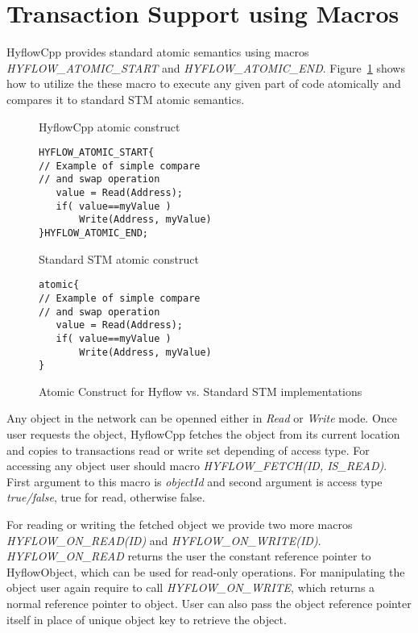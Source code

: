 \documentclass[12pt,english]{report}
\begin{document}
\section{Transaction Support using Macros}

HyflowCpp provides standard atomic semantics using macros \emph{HYFLOW{\_}ATOMIC{\_}START} and \emph{HYFLOW{\_}ATOMIC{\_}END}. Figure~\ref{Fig:atomicConstr} shows how to utilize the these macro to execute any given part of code atomically and compares it to standard STM atomic semantics. 

\begin{figure}
\centering 
\begin{footnotesize}
\begin{minipage}[b]{0.45\linewidth}\centering
HyflowCpp atomic construct 
\begin{lstlisting}
HYFLOW_ATOMIC_START{
// Example of simple compare
// and swap operation
   value = Read(Address);
   if( value==myValue )
       Write(Address, myValue)
}HYFLOW_ATOMIC_END;
\end{lstlisting} 
\end{minipage} 
\begin{minipage}[b]{0.45\linewidth}\centering
Standard STM atomic construct
\begin{lstlisting}   					   
atomic{
// Example of simple compare
// and swap operation
   value = Read(Address);
   if( value==myValue )
       Write(Address, myValue)
}
\end{lstlisting}			  
\end{minipage}
\end{footnotesize}
\label{Fig:atomicConstr}\caption{Atomic Construct for Hyflow vs. Standard STM implementations}
\end{figure}

Any object in the network can be openned either in \emph{Read} or \emph{Write} mode. Once user requests the object, HyflowCpp fetches the object from its current location and copies to transactions read or write set depending of access type. For accessing any object user should macro \emph{HYFLOW{\_}FETCH(ID, IS{\_}READ)}. First argument to this macro is \emph{objectId} and second argument is access type \emph{true/false}, true for read, otherwise false.

For reading or writing the fetched object we provide two more macros \emph{HYFLOW{\_}ON{\_}READ(ID)} and \emph{HYFLOW{\_}ON{\_}WRITE(ID)}. \emph{HYFLOW{\_}ON{\_}READ} returns the user the constant reference pointer to HyflowObject, which can be used for read-only operations. For manipulating the object user again require to call \emph{HYFLOW{\_}ON{\_}WRITE}, which returns a normal reference pointer to object. User can also pass the object reference pointer itself in place of unique object key to retrieve the object.   
\end{document}
